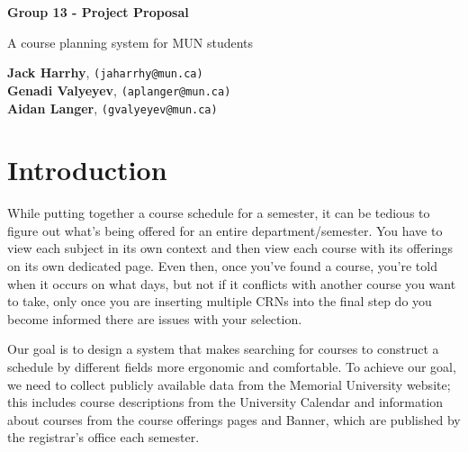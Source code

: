 \documentclass[12pt]{article}
\begin{document}
\begin{titlepage}
    \begin{center}
        \vspace*{1cm}
            
        \Huge
        \textbf{Group 13 - Project Proposal}
            
        \vspace{0.5cm}
        \LARGE
        A course planning system for MUN students
            
        \vspace{1.5cm}
            
        \textbf{Jack Harrhy},  \texttt{(jaharrhy@mun.ca)} \\
        \textbf{Genadi Valyeyev},  \texttt{(aplanger@mun.ca)}\\
        \textbf{Aidan Langer},  \texttt{(gvalyeyev@mun.ca)}\\
            
        \vfill
    \end{center}
\end{titlepage}
\section{Introduction}
While putting together a course schedule for a semester, it can be tedious to figure out what's being offered for an entire department/semester. You have to view each subject in its own context and then view each course with its offerings on its own dedicated page. Even then, once you've found a course, you're told when it occurs on what days, but not if it conflicts with another course you want to take, only once you are inserting multiple CRNs into the final step do you become informed there are issues with your selection. \par
Our goal is to design a system that makes searching for courses to construct a schedule by different fields more ergonomic and comfortable. To achieve our goal, we need to collect publicly available data from the Memorial University website; this includes course descriptions from the University Calendar and information about courses from the course offerings pages and Banner, which are published by the registrar's office each semester.
\end{document}
